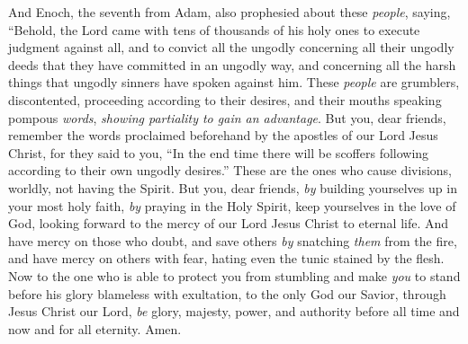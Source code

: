 \begin{biblechapter}
\verse And Enoch, the seventh from Adam, also prophesied about these \textit{people}, saying, “Behold, the Lord came with tens of thousands of his holy ones
\verse to execute judgment against all, and to convict all the ungodly concerning all their ungodly deeds that they have committed in an ungodly way, and concerning all the harsh things that ungodly sinners have spoken against him.
\verse These \textit{people} are grumblers, discontented, proceeding according to their desires, and their mouths speaking pompous \textit{words}, \textit{showing partiality to gain an advantage}.
 But you, dear friends, remember the words proclaimed beforehand by the apostles of our Lord Jesus Christ,
\verse for they said to you, “In the end time there will be scoffers following according to their own ungodly desires.”
\verse These are the ones who cause divisions, worldly, not having the Spirit.
\verse But you, dear friends, \textit{by} building yourselves up in your most holy faith, \textit{by} praying in the Holy Spirit,
\verse keep yourselves in the love of God, looking forward to the mercy of our Lord Jesus Christ to eternal life.
\verse And have mercy on those who doubt,
\verse and save others \textit{by} snatching \textit{them} from the fire, and have mercy on others with fear, hating even the tunic stained by the flesh.
 Now to the one who is able to protect you from stumbling and make \textit{you} to stand before his glory blameless with exultation,
\verse to the only God our Savior, through Jesus Christ our Lord, \textit{be} glory, majesty, power, and authority before all time and now and for all eternity. Amen.
\end{biblechapter}

